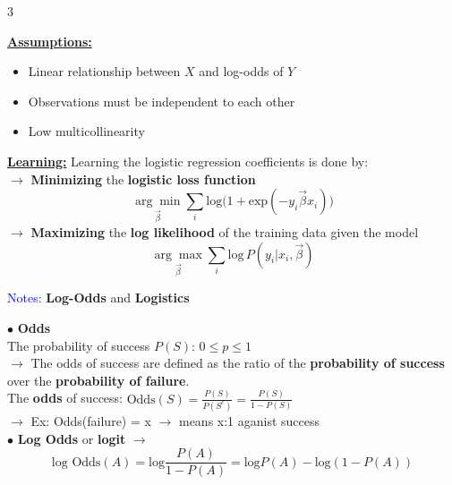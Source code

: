 \documentclass[letterpaper, 10.5pt,landscape]{article}
\begin{document}
\begin{multicols*}{3}
\vspace{-5pt}



\textbf{\underline{Assumptions:}}
\begin{itemize}[leftmargin=0.4cm]
    \vspace{-2pt}
    \item Linear relationship between $X$ and log-odds of $Y$
    \vspace{-2pt}
    \item  Observations must be independent to each other
    \vspace{-2pt}
    \item Low multicollinearity
    \vspace{-2pt}
\end{itemize}



\vspace{2pt}
\textbf{\underline{Learning:}} Learning the logistic regression coefficients is done by: \\

$\rightarrow$ \textbf{Minimizing} the \textbf{logistic loss function} 
\vspace{-5pt}
\[\boxed{\underset{\vec{\beta}} {\arg\min} \sum_{i} \text{log}\big(1+\text{exp}(-y_{i} \vec{\beta}x_{i}) \big)} \] 
$\rightarrow$ \textbf{Maximizing} the \textbf{log likelihood} of the training data given the model 
\vspace{-5pt}
\[\boxed{\underset{\vec{\beta}} {\arg\max} \sum_{i} \text{log} \hspace{2pt} P\left(y_{i} | x_{i}, \vec{\beta} \right)} \]


\textcolor{blue}{Notes:} \textbf{Log-Odds} and \textbf{Logistics}

\vspace{2pt}
$\bullet$ \textbf{Odds} \\
The probability of success $P(S)$:  \( 0 \leq p \leq 1\)\\
$\rightarrow$ The odds of success are defined as the ratio of the \textbf{probability of success} over the \textbf{probability of failure}. \\
The \textbf{odds} of success: \( \text{Odds}(S) = \frac{P(S)}{P(S^{c})} = \frac{P(S)}{1-P(S)} \) \\
$\rightarrow$ Ex: Odds(failure) = x $\rightarrow$ means x:1 aganist success \\

\vspace{3pt}
$\bullet$ \textbf{Log Odds} or \textbf{logit} $\rightarrow$
\vspace{-7pt}
\[\text{log Odds}(A) = \text{log} \frac{P(A)}{1-P(A)} = \text{log}P(A) - \text{log}\left(1-P(A) \right) \]
\vspace{-7pt}


\end{multicols*}
\end{document}
